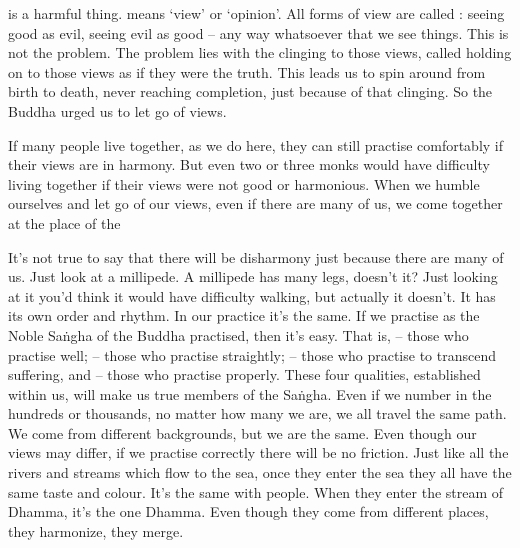  is a harmful thing.  means `view' or `opinion'. All forms of view are called : seeing good as evil, seeing evil as good -- any way whatsoever that we see things. This is not the problem. The problem lies with the clinging to those views, called  holding on to those views as if they were the truth. This leads us to spin around from birth to death, never reaching completion, just because of that clinging. So the Buddha urged us to let go of views.

If many people live together, as we do here, they can still practise comfortably if their views are in harmony. But even two or three monks would have difficulty living together if their views were not good or harmonious. When we humble ourselves and let go of our views, even if there are many of us, we come together at the place of the 

It's not true to say that there will be disharmony just because there are many of us. Just look at a millipede. A millipede has many legs, doesn't it? Just looking at it you'd think it would have difficulty walking, but actually it doesn't. It has its own order and rhythm. In our practice it's the same. If we practise as the Noble Sa\.ngha of the Buddha practised, then it's easy. That is,  -- those who practise well;  -- those who practise straightly;  -- those who practise to transcend suffering, and  -- those who practise properly. These four qualities, established within us, will make us true members of the Sa\.ngha. Even if we number in the hundreds or thousands, no matter how many we are, we all travel the same path. We come from different backgrounds, but we are the same. Even though our views may differ, if we practise correctly there will be no friction. Just like all the rivers and streams which flow to the sea, once they enter the sea they all have the same taste and colour. It's the same with people. When they enter the stream of Dhamma, it's the one Dhamma. Even though they come from different places, they harmonize, they merge.


